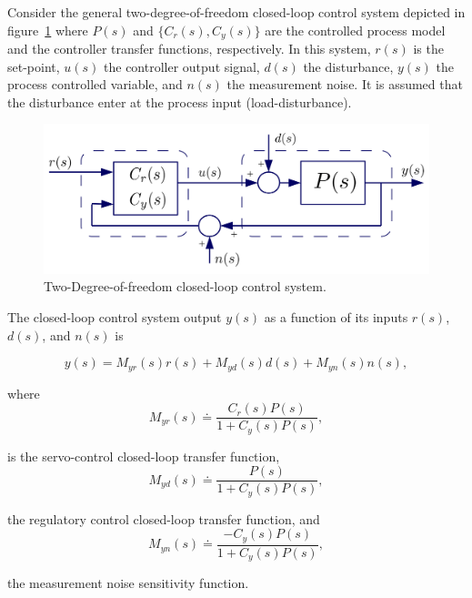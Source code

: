 Consider the general two-degree-of-freedom closed-loop control system depicted in figure~\ref{Ch2fig:DoFControlSystem} where $P(s)$ and $\{C_r(s), C_y(s)\}$ are the controlled process model and the controller transfer functions, respectively.  In this system, $r(s)$ is the set-point, $u(s)$ the controller output signal, $d(s)$ the disturbance, $y(s)$ the process controlled variable, and $n(s)$ the measurement noise. It is assumed that the disturbance enter at the process input (load-disturbance).

\begin{figure}[htb]
\centering
	\includegraphics[width=0.8\linewidth]{../figuras/Ch2DoFControlSystem} 
\caption{Two-Degree-of-freedom closed-loop control system.} 
\label{Ch2fig:DoFControlSystem}
\end{figure}


The closed-loop control system output $y(s)$ as a function of its inputs $r(s)$, $d(s)$, and $n(s)$ is

\begin{equation}
	y(s) = M_{yr}(s) r(s) + M_{yd}(s) d(s) + M_{yn}(s) n(s), \label{Ch2eq:yt}
\end{equation}

\noindent where
\begin{equation}
	M_{yr}(s) \doteq \frac{C_r(s)P(s)}{1+C_y(s)P(s)}, \label{Ch2eq:myr}
\end{equation}

\noindent is the servo-control closed-loop transfer function, 
\begin{equation}
	M_{yd}(s) \doteq \frac{P(s)}{1+C_y(s)P(s)}, \label{Ch2eq:myd}
\end{equation}

\noindent the regulatory control closed-loop transfer function, and
\begin{equation}
	M_{yn}(s) \doteq \frac{-C_y(s)P(s)}{1+C_y(s)P(s)}, \label{Ch2eq:myn}
\end{equation}

\noindent the measurement noise sensitivity function.\\

